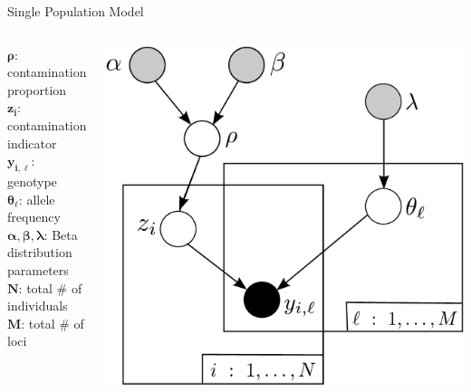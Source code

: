 \documentclass[letter,graphicx]{beamer}
\begin{document}
\begin{frame}{Single Population Model}
\begin{columns}[c]

\column{2.25in}
$\boldsymbol{\rho}$: contamination proportion \\
\vspace{3mm}
$\boldsymbol{z_i}$: contamination indicator \\
\vspace{3mm}
$\boldsymbol{y_{i,\ell}}$: genotype \\
\vspace{3mm}
$\boldsymbol{\theta_{\ell}}$: allele frequency \\
\vspace{3mm}
$\boldsymbol{\alpha}, \pmb{\beta}, \boldsymbol{\lambda}$: Beta distribution parameters \\
\vspace{3mm}
$\boldsymbol{N}$: total \# of individuals \\
\vspace{3mm}
$\boldsymbol{M}$: total \# of loci

\column{2in}
\begin{center}
\includegraphics[width=1\textwidth]{images/DAG_1.pdf}
\end{center}
\end{columns}
\end{frame}
\end{document}

